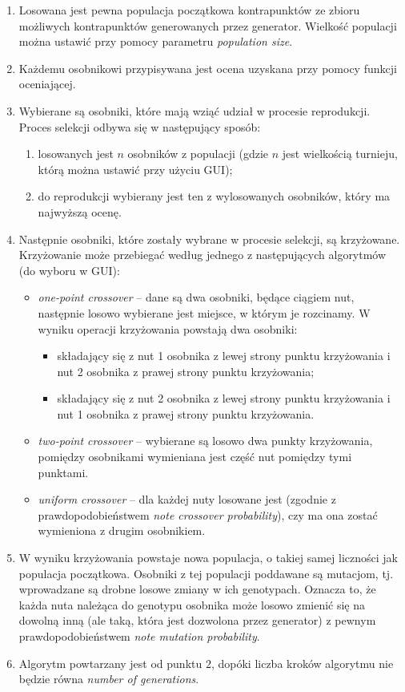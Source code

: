 \documentclass{article}
\begin{document}
\begin{enumerate}
\item Losowana jest pewna populacja początkowa kontrapunktów ze zbioru możliwych kontrapunktów generowanych przez generator. Wielkość populacji można ustawić przy pomocy parametru \emph{population size}.
\item Każdemu osobnikowi przypisywana jest ocena uzyskana przy pomocy funkcji oceniającej.
\item Wybierane są osobniki, które mają wziąć udział w procesie reprodukcji. Proces selekcji odbywa się w następujący sposób:
	\begin{enumerate}
		\item losowanych jest $n$ osobników z populacji (gdzie $n$ jest wielkością turnieju, którą można ustawić przy użyciu GUI);
		\item do reprodukcji wybierany jest ten z wylosowanych osobników, który ma najwyższą ocenę.
	\end{enumerate}

\item Następnie osobniki, które zostały wybrane w procesie selekcji, są krzyżowane. Krzyżowanie może przebiegać według jednego z następujących algorytmów (do wyboru w GUI):

	\begin{itemize}
		\item \emph{one-point crossover} -- dane są dwa osobniki, będące ciągiem nut, następnie losowo wybierane jest miejsce, w którym je rozcinamy. W wyniku operacji krzyżowania powstają dwa osobniki:
			\begin{itemize}
				\item składający się z nut 1 osobnika z lewej strony punktu krzyżowania i nut 2 osobnika z prawej strony punktu krzyżowania;
				\item składający się z nut 2 osobnika z lewej strony punktu krzyżowania i nut 1 osobnika z prawej strony punktu krzyżowania.
			\end{itemize}
		\item \emph{two-point crossover} -- wybierane są losowo dwa punkty krzyżowania, pomiędzy osobnikami wymieniana jest część nut pomiędzy tymi punktami.
		\item \emph{uniform crossover} -- dla każdej nuty losowane jest (zgodnie z prawdopodobieństwem \emph{note crossover probability}), czy ma ona zostać wymieniona z drugim osobnikiem.
	\end{itemize}

\item W wyniku krzyżowania powstaje nowa populacja, o takiej samej liczności jak populacja początkowa. Osobniki z tej populacji poddawane są mutacjom, tj. wprowadzane są drobne losowe zmiany w ich genotypach. Oznacza to, że każda nuta należąca do genotypu osobnika może losowo zmienić się na dowolną inną (ale taką, która jest dozwolona przez generator) z pewnym prawdopodobieństwem \emph{note mutation probability}. 

\item Algorytm powtarzany jest od punktu $2$, dopóki liczba kroków algorytmu nie będzie równa \emph{number of generations}.
\end{enumerate}
\end{document}
